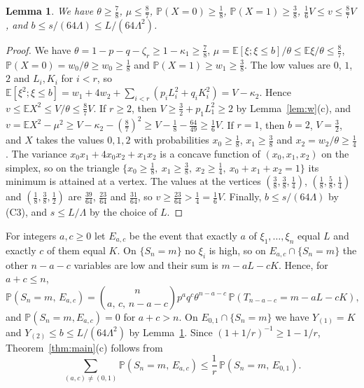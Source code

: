 \documentclass[11pt]{amsart}
\newtheorem{lemma}[theorem]{Lemma}
\numberwithin{equation}{section}
\newcommand{\Pp}{\mathbb P}
\newcommand{\E}{\mathbb E}
\begin{document}
\begin{lemma}\label{lem:low}
We have $\theta\ge\frac78$, $\mu\le\frac87$, $\Pp(X=0)\ge\frac18$, $\Pp(X=1)\ge\frac38$, $\frac16V\le v\le\frac87V$, and $b\le s/(64\Lambda)\le L/(64\Lambda^2)$.
\end{lemma}

\begin{proof}
We have $\theta=1-p-q-\zeta_r\ge1-\kappa_1\ge\frac78$, $\mu=\E[\xi;\xi\le b]/\theta\le\E\xi/\theta\le\frac87$, $\Pp(X=0)=w_0/\theta\ge w_0\ge\frac18$ and $\Pp(X=1)\ge w_1\ge\frac38$. The low values are $0$, $1$, $2$ and $L_i,K_i$ for $i<r$, so $\E[\xi^2;\xi\le b]=w_1+4w_2+\sum_{i<r}(p_iL_i^2+q_iK_i^2)=V-\kappa_2$. Hence $v\le\E X^2\le V/\theta\le\frac87V$. If $r\ge2$, then $V\ge\frac32+p_1L_1^2\ge2$ by Lemma~\ref{lem:w}(c), and $v=\E X^2-\mu^2\ge V-\kappa_2-(\frac87)^2\ge V-\frac18-\frac{64}{49}\ge\frac16V$. If $r=1$, then $b=2$, $V=\frac32$, and $X$ takes the values $0,1,2$ with probabilities $x_0\ge\frac18$, $x_1\ge\frac38$ and $x_2=w_2/\theta\ge\frac14$. The variance $x_0x_1+4x_0x_2+x_1x_2$ is a concave function of $(x_0,x_1,x_2)$ on the simplex, so on the triangle $\{x_0\ge\frac18,\ x_1\ge\frac38,\ x_2\ge\frac14,\ x_0+x_1+x_2=1\}$ its minimum is attained at a vertex. The values at the vertices $(\frac38,\frac38,\frac14)$, $(\frac18,\frac58,\frac14)$ and $(\frac18,\frac38,\frac12)$ are $\frac{39}{64}$, $\frac{23}{64}$ and $\frac{31}{64}$, so $v\ge\frac{23}{64}>\frac14=\frac16V$. Finally, $b\le s/(64\Lambda)$ by (C3), and $s\le L/\Lambda$ by the choice of $L$.
\end{proof}

For integers $a,c\ge0$ let $E_{a,c}$ be the event that exactly $a$ of $\xi_1,\dots,\xi_n$ equal $L$ and exactly $c$ of them equal $K$. On $\{S_n=m\}$ no $\xi_i$ is high, so on $E_{a,c}\cap\{S_n=m\}$ the other $n-a-c$ variables are low and their sum is $m-aL-cK$. Hence, for $a+c\le n$,
\begin{equation}\label{eq:decomp}
\Pp(S_n=m,\,E_{a,c})=\binom{n}{a,\,c,\,n-a-c}p^aq^c\theta^{n-a-c}\,\Pp(T_{n-a-c}=m-aL-cK),
\end{equation}
and $\Pp(S_n=m,E_{a,c})=0$ for $a+c>n$. On $E_{0,1}\cap\{S_n=m\}$ we have $Y_{(1)}=K$ and $Y_{(2)}\le b\le L/(64\Lambda^2)$ by Lemma~\ref{lem:low}. Since $(1+1/r)^{-1}\ge1-1/r$, Theorem~\ref{thm:main}(c) follows from
\begin{equation}\label{eq:goal}
\sum_{(a,c)\ne(0,1)}\Pp(S_n=m,\,E_{a,c})\le\frac1r\,\Pp(S_n=m,\,E_{0,1}).
\end{equation}
\end{document}
